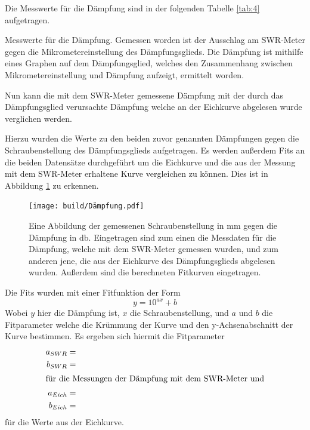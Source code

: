                 Die Messwerte für die Dämpfung sind in der folgenden Tabelle \ref{tab:4} aufgetragen.
                \begin{table}[H]
                    \centering
                    \caption{
                        Messwerte für die Dämpfung.
                        Gemessen worden ist der Ausschlag am SWR-Meter gegen die Mikrometereinstellung
                        des Dämpfungsglieds. Die Dämpfung ist mithilfe eines Graphen auf dem Dämpfungsglied,
                        welches den Zusammenhang zwischen Mikrometereinstellung und Dämpfung aufzeigt, ermittelt worden.
                    } 
                    
                    \label{tab:4}
                \end{table}
                Nun kann die mit dem SWR-Meter gemessene Dämpfung mit der durch das Dämpfungsglied verursachte Dämpfung welche an der Eichkurve abgelesen wurde verglichen werden.
                
                Hierzu wurden die Werte zu den beiden zuvor genannten Dämpfungen gegen die Schraubenstellung des Dämpfungsglieds aufgetragen.
                Es werden außerdem Fits an die beiden Datensätze durchgeführt um die Eichkurve und die aus der Messung mit dem SWR-Meter erhaltene Kurve vergleichen zu können.
                Dies ist in Abbildung \ref{fig:9} zu erkennen.
                \begin{figure}[H]
                    \centering
                    \texttt{[image: build/Dämpfung.pdf]}
                    \caption{
                        Eine Abbildung der gemessenen Schraubenstellung in $\si{\milli\meter}$ gegen die Dämpfung in $\si{\decibel}$.
                        Eingetragen sind zum einen die Messdaten für die Dämpfung, welche mit dem SWR-Meter gemessen wurden, und zum anderen jene, die aus der Eichkurve des Dämpfungsglieds abgelesen wurden.
                        Außerdem sind die berechneten Fitkurven eingetragen. \cite{matplotlib}
                    }
                    \label{fig:9}
                \end{figure}
                
                Die Fits wurden mit einer Fitfunktion der Form
                \begin{equation}
                    y = 10^{ax} + b \label{eq:16}
                \end{equation}
                Wobei $y$ hier die Dämpfung ist, $x$ die Schraubenstellung, und $a$ und $b$ die Fitparameter welche die Krümmung der Kurve und den y-Achsenabschnitt der Kurve bestimmen.
                Es ergeben sich hiermit die Fitparameter
                \begin{align}
                    a_{SWR} &=  \label{eq:17}\\
                    b_{SWR} &= \\
                    \intertext{für die Messungen der Dämpfung mit dem SWR-Meter und}
                    a_{Eich} &= \\
                    b_{Eich} &=  \label{eq:20}
                \end{align}
                für die Werte aus der Eichkurve.

